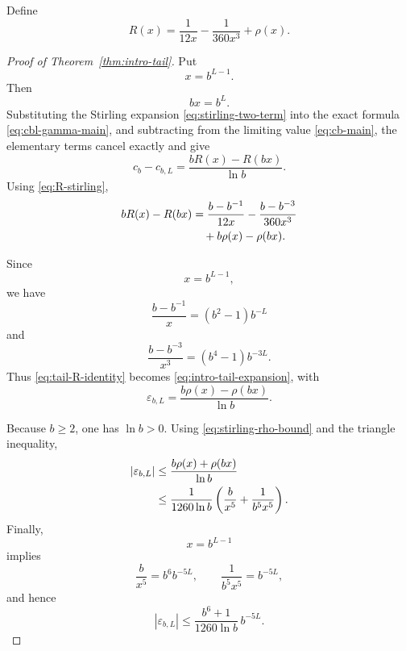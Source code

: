 \documentclass[11pt]{article}
\theoremstyle{definition}
\theoremstyle{remark}
\begin{document}
Define
\begin{equation}
    R(x)
    =
    \frac{1}{12x}
    -
    \frac{1}{360x^3}
    +
    \rho(x).
    \label{eq:R-stirling}
\end{equation}

\begin{proof}[Proof of Theorem~\ref{thm:intro-tail}]
Put
\[
    x=b^{L-1}.
\]
Then
\[
    bx=b^L.
\]
Substituting the Stirling expansion
\eqref{eq:stirling-two-term}
into the exact formula
\eqref{eq:cbl-gamma-main}, and subtracting from the limiting value
\eqref{eq:cb-main}, the elementary terms cancel exactly and give
\begin{equation}
    c_b-c_{b,L}
    =
    \frac{bR(x)-R(bx)}{\ln b}.
    \label{eq:tail-R-identity}
\end{equation}
Using
\eqref{eq:R-stirling},
\begin{align}
    bR(x)-R(bx)
    &=
    \frac{b-b^{-1}}{12x}
    -
    \frac{b-b^{-3}}{360x^3}
    \notag\\
    &\quad+
    b\rho(x)-\rho(bx).
    \label{eq:bR-minus-R}
\end{align}

Since
\[
    x=b^{L-1},
\]
we have
\begin{equation}
    \frac{b-b^{-1}}{x}
    =
    (b^2-1)b^{-L}
    \label{eq:first-tail-conversion}
\end{equation}
and
\begin{equation}
    \frac{b-b^{-3}}{x^3}
    =
    (b^4-1)b^{-3L}.
    \label{eq:second-tail-conversion}
\end{equation}
Thus
\eqref{eq:tail-R-identity}
becomes
\eqref{eq:intro-tail-expansion}, with
\begin{equation}
    \varepsilon_{b,L}
    =
    \frac{
        b\rho(x)-\rho(bx)
    }{\ln b}.
    \label{eq:epsilon-definition}
\end{equation}

Because \(b\ge2\), one has \(\ln b>0\).
Using
\eqref{eq:stirling-rho-bound} and the triangle inequality,
\begin{align}
    |\varepsilon_{b,L}|
    &\le
    \frac{
        b\rho(x)+\rho(bx)
    }{\ln b}
    \notag\\
    &\le
    \frac{1}{1260\ln b}
    \left(
        \frac{b}{x^5}
        +
        \frac{1}{b^5x^5}
    \right).
    \label{eq:epsilon-bound-intermediate}
\end{align}
Finally,
\[
    x=b^{L-1}
\]
implies
\[
    \frac{b}{x^5}
    =
    b^6b^{-5L},
    \qquad
    \frac{1}{b^5x^5}
    =
    b^{-5L},
\]
and hence
\[
    |\varepsilon_{b,L}|
    \le
    \frac{b^6+1}{1260\ln b}\,b^{-5L}.
\]
\end{proof}
\end{document}
